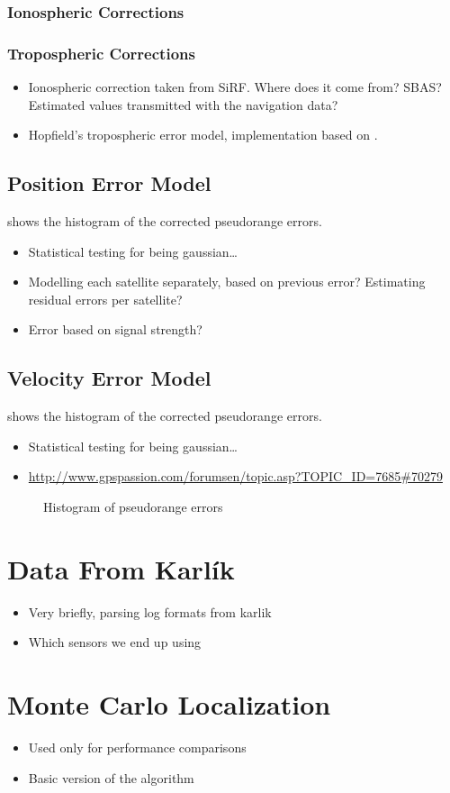 \subsubsection{Ionospheric Corrections}

\subsubsection{Tropospheric Corrections}
\begin{itemize}
\item Ionospheric correction taken from SiRF. Where does it come from? SBAS?
    Estimated values transmitted with the navigation data?
\item Hopfield's tropospheric error model, implementation based on \cite{sam-www}.
\end{itemize}

\subsection{Position Error Model}
 shows the histogram of the corrected pseudorange
errors.
\begin{itemize}
\item Statistical testing for being gaussian\ldots
\item Modelling each satellite separately, based on previous error?
      Estimating residual errors per satellite?
\item Error based on signal strength?
\end{itemize}

\subsection{Velocity Error Model}
 shows the histogram of the corrected pseudorange
errors.
\begin{itemize}
\item Statistical testing for being gaussian\ldots
\item \url{http://www.gpspassion.com/forumsen/topic.asp?TOPIC_ID=7685#70279}
\end{itemize}

\begin{figure}[tp]
	\centering
	\caption{Histogram of pseudorange errors}
	\label{fig:impl-error-histogam}
\end{figure}

\section{Data From Karlík}
\begin{itemize}
\item Very briefly, parsing log formats from karlik
\item Which sensors we end up using
\end{itemize}

\section{Monte Carlo Localization}
\begin{itemize}
\item Used only for performance comparisons
\item Basic version of the algorithm
\end{itemize}

